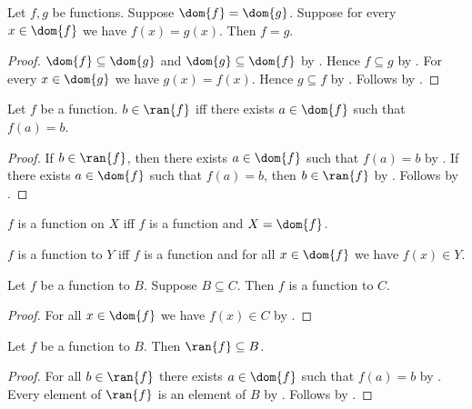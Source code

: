 \begin{proposition}\label{funext_on_domain}
    Let $f,g$ be functions.
    Suppose $\dom{f}=\dom{g}$.
    Suppose for every $x\in\dom{f}$ we have $f(x)=g(x)$.
    Then $f=g$.
\end{proposition}
\begin{proof}
    $\dom{f}\subseteq\dom{g}$ and $\dom{g}\subseteq\dom{f}$ by
        .
    Hence $f\subseteq g$ by .
    For every $x\in\dom{g}$ we have $g(x)=f(x)$.
    Hence $g\subseteq f$ by .
    Follows by .
\end{proof}

\begin{proposition}\label{fun_ran_iff}
    Let $f$ be a function.
    $b\in\ran{f}$ iff there exists $a\in\dom{f}$ such that $f(a) = b$.
\end{proposition}
\begin{proof}
    If $b\in\ran{f}$, then there exists $a\in\dom{f}$ such that $f(a) = b$
        by .
    If there exists $a\in\dom{f}$ such that $f(a) = b$, then $b\in\ran{f}$
        by .
    Follows by \auto.
\end{proof}

\begin{abbreviation}\label{function_on}
    $f$ is a function on $X$ iff $f$ is a function and $X = \dom{f}$.
\end{abbreviation}

\begin{abbreviation}\label{function_to}
    $f$ is a function to $Y$ iff $f$ is a function and for all $x\in\dom{f}$ we have $f(x)\in Y$.
\end{abbreviation}

\begin{proposition}\label{function_on_weaken_codom}
    Let $f$ be a function to $B$.
    Suppose $B\subseteq C$.
    Then $f$ is a function to $C$.
\end{proposition}
\begin{proof}
    For all $x\in\dom{f}$ we have $f(x)\in C$ by .
\end{proof}

\begin{proposition}\label{function_to_ran}
    Let $f$ be a function to $B$.
    Then $\ran{f}\subseteq B$.
\end{proposition}
\begin{proof}
    For all $b\in\ran{f}$ there exists $a\in\dom{f}$ such that $f(a) = b$
        by .
    Every element of $\ran{f}$ is an element of $B$ by \auto.
    Follows by .
\end{proof}

